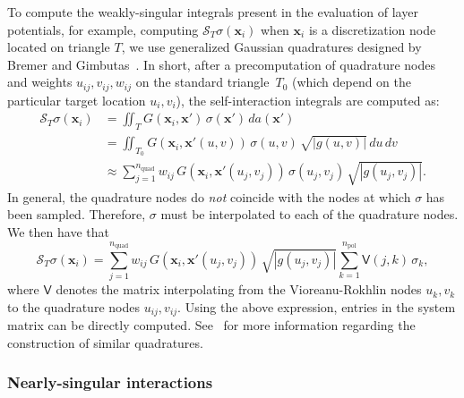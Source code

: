 \documentclass[11pt]{article}
\newcommand{\mtx}[1]{\bm{\mathsf{#1}}}
\newcommand{\entry}[1]{{\mathsf{#1}}}
\newcommand{\bx}{\bm x}
\newcommand{\cS}{\mathcal S}
\newcommand{\npol}{n_{\text{pol}}}
\newcommand{\nquad}{n_{\text{quad}}}
\numberwithin{equation}{section}
\begin{document}
To compute the weakly-singular integrals present in the evaluation of
layer potentials, for example, computing $\cS_T \sigma(\bx_i)$ when
$\bx_i$ is a discretization node located on triangle $T$, we use
generalized Gaussian quadratures designed by Bremer and
Gimbutas~\cite{bremer_2012c}. In short, after a precomputation of
quadrature nodes and weights $u_{ij},v_{ij},w_{ij}$ on the standard
triangle~$T_0$ (which depend on the particular target location
$u_i, v_i$), the self-interaction integrals are computed as:
\begin{equation}
  \begin{aligned}
  \cS_T \sigma(\bx_i) &= \iint_T G(\bx_i,\bx') \, \sigma(\bx') \,
  da(\bx') \\
  &= \iint_{T_0} G(\bx_i, \bx'(u,v)) \, \sigma(u,v) \,
  \sqrt{|g(u,v)|} \, du \, dv \\
  &\approx \sum_{j = 1}^{\nquad} w_{ij} \, G(\bx_i,\bx'(u_j, v_j)) \,
  \sigma(u_j, v_j) \,   \sqrt{|g(u_j,v_j)|}.
  \end{aligned}
\end{equation}
In general, the quadrature nodes do \emph{not} coincide with the nodes
at which $\sigma$ has been sampled. Therefore, $\sigma$ must be
interpolated to each of the quadrature nodes. We then have that
\begin{equation}
  \cS_T \sigma(\bx_i) = \sum_{j = 1}^{\nquad} w_{ij} \,
  G(\bx_i,\bx'(u_j, v_j)) \,
  \sqrt{|g(u_j,v_j)|} \sum_{k = 1}^{\npol} \entry{V}(j,k) \, \sigma_k,
\end{equation}
where $\mtx{V}$ denotes the matrix interpolating from the
Vioreanu-Rokhlin nodes $u_k,v_k$ to the quadrature nodes $u_{ij},v_{ij}$.
Using the above expression, entries in the system matrix can be
directly computed. See~\cite{bremer_2012c, bremer, bremer_2013} for more
information regarding the construction of similar quadratures.




\subsubsection{Nearly-singular interactions}
\end{document}
